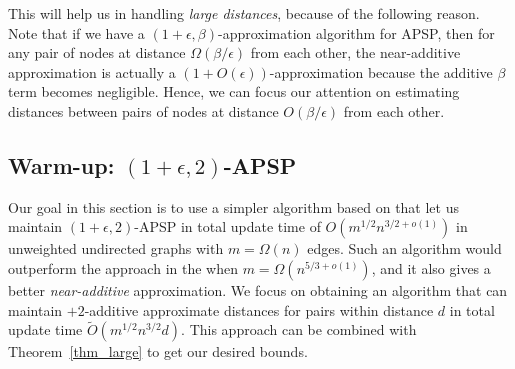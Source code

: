 \documentclass[11pt]{article}
\theoremstyle{definition}
\theoremstyle{remark}
\newcommand{\remove}[1]{}
\begin{document}
This will help us in handling \emph{large distances}, because of the following reason. Note that if we have a $(1+\epsilon,\beta)$-approximation algorithm for APSP, then for any pair of nodes at distance $\Omega(\beta/\epsilon)$ from each other, the near-additive approximation is actually a $(1+O(\epsilon))$-approximation because the additive $\beta$ term becomes negligible. Hence, we can focus our attention on estimating distances between pairs of nodes at distance $O(\beta/\epsilon)$ from each other.


\subsection{Warm-up: \texorpdfstring{$(1+\epsilon,2)$}{(1+epsilon,2)}-APSP }\label{sec:additive_warm_up}

Our goal in this section is to use a simpler algorithm based on \cite{DHZ00} that let us maintain $(1+\epsilon,2)$-APSP in total update time of $O(m^{1/2}n^{3/2+o(1)})$ in unweighted undirected graphs with $m=\Omega(n)$ edges. Such an algorithm would outperform the approach in the  when $m= \Omega( n^{5/3+o(1)} )$, and it also gives a better \emph{near-additive} approximation. We focus on obtaining an algorithm that can maintain $+2$-additive approximate distances for pairs within distance $d$ in total update time $\tilde{O}(m^{1/2}n^{3/2}d)$. This approach can be combined with Theorem~\ref{thm_large} to get our desired bounds. 

\remove{
The static version of the data structure is as follows:

\begin{itemize}
    \item Set $s_1= (\frac{m}{n})^{1/2}$. Let $V_1$ be the set of \textit{dense nodes}: $V_1:= \{ v \in V: \deg(v) \geq s_1\}$. Also let $E_2$ be the set of \textit{sparse edges}, i.e. edges with at least one endpoint with degree less than $s_1$.
    \item Construct a hitting set $D_1$ of nodes in $V_1$. %
    This means that every node $v \in V_1$ has a neighbor in $D_1$. The size of $D_1$ is $O(n \log{n}/s_1)$.
    \item Let $E^*$ be a set of size $O(n)$ such that for each $v \in V_1$, there exists $u \in D_1 \cap N(v)$ such that $\{u,v\} \in E^*$. 
    \item Store distances $D_1 \times V$ by running a BFS from each $u \in D_1$ on the input graph $G$. 
    \item For each $u \in V \setminus D_1$ store a shortest path tree, denoted by $T_u$  rooted at $u$ by running Dijkstra on $(V, E_2 \cup E^* \cup E^{D_1}_u)$, where $E^{D_1}_u$ is the set of weighted edges corresponding to distances in $(\{u\} \times D_1)$ computed in the previous step. 
\end{itemize}
}
\end{document}
